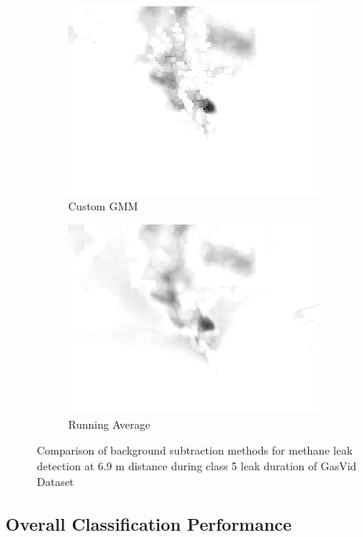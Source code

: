\begin{figure}[htbp]
\begin{subfigure}[t]{0.24\textwidth}
\includegraphics[width=\textwidth]{images/cgmm.png}
\caption{Custom GMM}
\label{fig:cgmm}
\end{subfigure}%
\hfill%
\begin{subfigure}[t]{0.24\textwidth}
\centering
\includegraphics[width=\textwidth]{images/running_average.png}
\caption{Running Average}
\label{fig:running_avg}
\end{subfigure}
\caption{Comparison of background subtraction methods for methane leak detection at 6.9 m distance during class 5 leak duration of GasVid Dataset}
\label{fig:background_comparison}
\end{figure}

\subsection{Overall Classification Performance}

